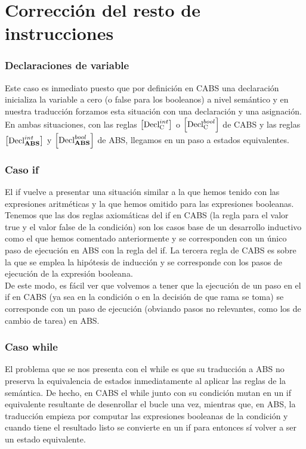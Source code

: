 \section{Corrección del resto de instrucciones}

\subsubsection{Declaraciones de variable}
Este caso es inmediato puesto que por definición en CABS una declaración inicializa la variable a cero (o false para los booleanos) a nivel semántico y en nuestra traducción forzamos esta situación con una declaración y una asignación. En ambas situaciones, con las reglas $\left[ \text{Decl}_{\text{C}}^{int} \right]$ o $\left[ \text{Decl}_{\text{C}}^{bool} \right]$ de CABS y las reglas $\left[ \text{Decl}_{\text{\textbf{ABS}}}^{int} \right]$ y $\left[ \text{Decl}_{\text{\textbf{ABS}}}^{bool} \right]$ de ABS, llegamos en un paso a estados equivalentes.

\subsubsection{Caso if}
El if vuelve a presentar una situación similar a la que hemos tenido con las expresiones aritméticas y la que hemos omitido para las expresiones booleanas.\\

Tenemos que las dos reglas axiomáticas del if en CABS (la regla para el valor true y el valor false de la condición) son los casos base de un desarrollo inductivo como el que hemos comentado anteriormente y se corresponden con un único paso de ejecución en ABS con la regla del if. La tercera regla de CABS es sobre la que se emplea la hipótesis de inducción y se corresponde con los pasos de ejecución de la expresión booleana.\\

De este modo, es fácil ver que volvemos a tener que la ejecución de un paso en el if en CABS (ya sea en la condición o en la decisión de que rama se toma) se corresponde con un paso de ejecución (obviando pasos no relevantes, como los de cambio de tarea) en ABS.

\subsubsection{Caso while}
El problema que se nos presenta con el while es que su traducción a ABS no preserva la equivalencia de estados inmediatamente al aplicar las reglas de la semántica. De hecho, en CABS el while junto con su condición mutan en un if equivalente resultante de desenrollar el bucle una vez, mientras que, en ABS, la traducción empieza por computar las expresiones booleanas de la condición y cuando tiene el resultado listo se convierte en un if para entonces sí volver a ser un estado equivalente.\\

